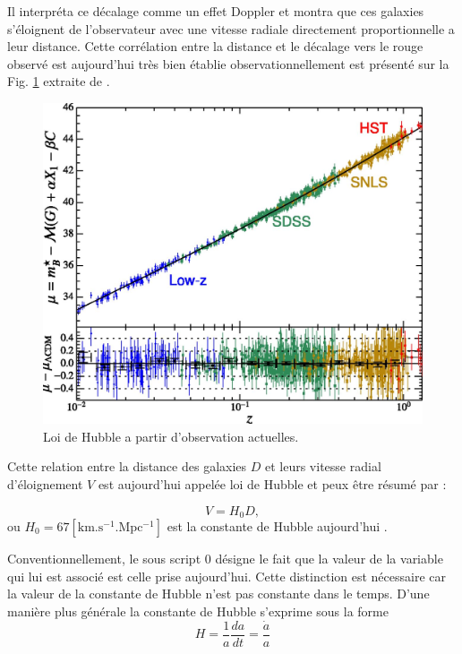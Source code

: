 Il interpréta ce décalage comme un effet Doppler et montra que ces galaxies s'éloignent de l'observateur avec une vitesse radiale directement proportionnelle a leur distance.
Cette corrélation entre la distance et le décalage vers le rouge observé est aujourd'hui très bien établie observationnellement est présenté sur la Fig. \ref{fig:hubble_law} extraite de \citep{2015PNAS..112.3173B}.

\begin{figure}[bth]
        \includegraphics[width=.9\linewidth]{img/01/hubble_law.jpg} 
        \caption{Loi de Hubble a partir d'observation actuelles. 
        }
 		\label{fig:hubble_law}
\end{figure}

Cette relation entre la distance des galaxies $D$ et leurs vitesse radial d'éloignement $V$ est aujourd'hui appelée loi de Hubble et peux être résumé par :

\begin{equation}
V = H_0 D,
\end{equation}
ou $H_0 = 67 \mathrm{ \left[ km.s^{-1}.Mpc^{-1} \right ] }$ est la constante de Hubble aujourd'hui \citep{planck_collaboration_planck_2016}.

Conventionnellement, le sous script $0$ désigne le fait que la valeur de la variable qui lui est associé est celle prise aujourd'hui.
Cette distinction est nécessaire car la valeur de la constante de Hubble n'est pas constante dans le temps.
D'une manière plus générale la constante de Hubble s'exprime sous la forme
\begin{equation}
H=\frac{1}{a} \frac{da}{dt} = \frac{\dot{a}}{a}
\end{equation}

